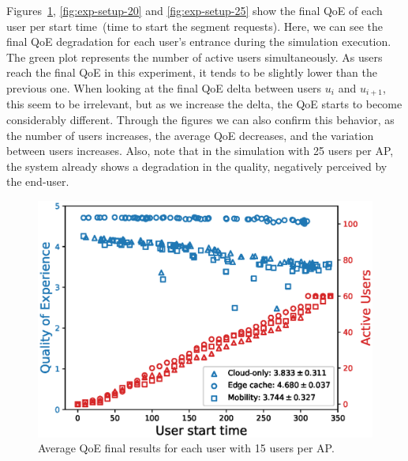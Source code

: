 Figures~\ref{fig:exp-setup-15}, \ref{fig:exp-setup-20} and \ref{fig:exp-setup-25} show the final QoE of each user per start time~(time to start the segment requests). Here, we can see the final QoE degradation for each user's entrance during the simulation execution. The green plot represents the number of active users simultaneously.  
As users reach the final QoE in this experiment, it tends to be slightly lower than the previous one. When looking at the final QoE delta between users $u_{i}$ and $u_{i + 1}$, this seem to be irrelevant, but as we increase the delta, the QoE starts to become considerably different. Through the figures we can also confirm this behavior, as the number of users increases, the average QoE decreases, and the variation between users increases. Also, note that in the simulation with 25 users per AP, the system already shows a degradation in the quality, negatively perceived by the end-user.

\begin{figure}[!h]
    \centering
    \includegraphics[width=\linewidth]{images/UserQoExUserStartTime15users-2.eps}
    \vspace{-0.4cm}
    \caption{Average QoE final results for each user with 15 users per AP.}
    \label{fig:exp-setup-15}
\end{figure}

